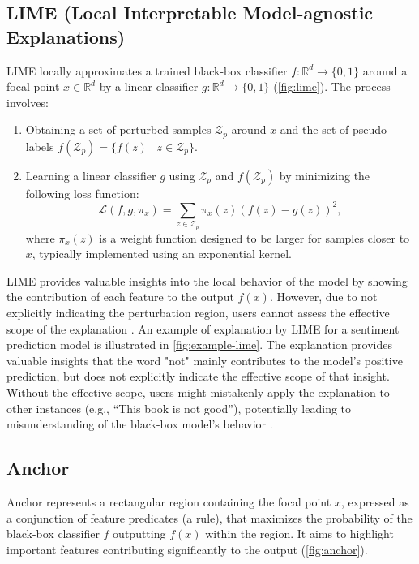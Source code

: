 \documentclass[runningheads]{llncs}
\begin{document}
\subsection{LIME (Local Interpretable Model-agnostic Explanations) \cite{ribeiro2016why}}
LIME locally
approximates a trained black-box classifier $f: \mathbb{R}^d \to \{0,1\}$
around a focal point $x \in \mathbb{R}^d$
by a linear classifier $g: \mathbb{R}^d \to \{0,1\}$
(\cref{fig:lime}).
The process involves:
\begin{enumerate}
	\item Obtaining a set of perturbed samples $\mathcal{Z}_p$ around $x$
	      and the set of pseudo-labels $f(\mathcal{Z}_p) = \{f(z) \mid z \in \mathcal{Z}_p\}$.
	\item Learning a linear classifier $g$
	      using $\mathcal{Z}_p$ and $f(\mathcal{Z}_p)$
	      by minimizing the following loss function:
	      \begin{equation}
		      \label{eq:lime_loss}
		      \mathcal{L}(f,g,\pi_x)=\sum_{z\in\mathcal{Z}_p}
		      \pi_x(z){\left(f(z)-g(z)\right)}^2,
	      \end{equation}
	      where $\pi_x(z)$ is a weight function designed to be larger for samples
	      closer to $x$, typically implemented using an exponential kernel.
\end{enumerate}

LIME provides valuable insights into the local behavior of the model
by showing the contribution of each feature to the output $f(x)$.
However, due to not explicitly indicating the perturbation region,
users cannot assess the effective scope of the explanation
\cite{ribeiro2018anchors}.
An example of explanation by LIME for a sentiment prediction model
is illustrated in \cref{fig:example-lime}.
The explanation provides valuable insights that
the word "not" mainly contributes to the model's positive prediction,
but does not explicitly indicate the effective scope of that insight.
Without the effective scope,
users might mistakenly apply the explanation to other instances
(e.g., ``This book is not good''),
potentially leading to misunderstanding of the black-box model's behavior
\cite{ribeiro2018anchors}.

\subsection{Anchor \cite{ribeiro2018anchors}}\label{sec:anchor}
Anchor represents a rectangular region containing the focal point $x$,
expressed as a conjunction of feature predicates (a rule),
that maximizes the probability of the black-box classifier $f$
outputting $f(x)$ within the region.
It aims to highlight important features
contributing significantly to the output (\cref{fig:anchor}).
\end{document}
